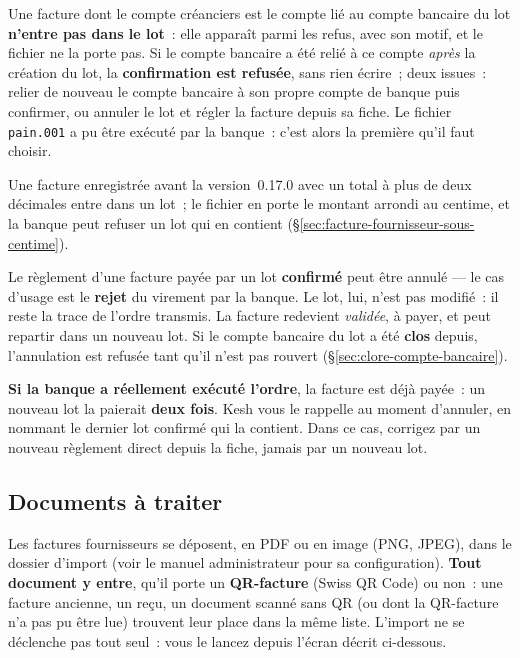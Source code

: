 \documentclass[a4paper,11pt,oneside]{article}
\begin{document}
Une facture dont le compte créanciers est le compte lié au compte bancaire du lot
\textbf{n'entre pas dans le lot}~: elle apparaît parmi les refus, avec son motif, et le fichier
ne la porte pas. Si le compte bancaire a été relié à ce compte \emph{après} la création du lot,
la \textbf{confirmation est refusée}, sans rien écrire~; deux issues~: relier de nouveau le compte
bancaire à son propre compte de banque puis confirmer, ou annuler le lot et régler la facture
depuis sa fiche. Le fichier \texttt{pain.001} a pu être exécuté par la banque~: c'est alors la
première qu'il faut choisir.

Une facture enregistrée avant la version~0.17.0 avec un total à plus de deux décimales
entre dans un lot~; le fichier en porte le montant arrondi au centime, et la banque peut refuser
un lot qui en contient (\S\ref{sec:facture-fournisseur-sous-centime}).

\begin{keshwarning}[title=\faExclamationTriangle\ Annuler le règlement d'une facture payée par lot]
Le règlement d'une facture payée par un lot \textbf{confirmé} peut être annulé --- le cas
d'usage est le \textbf{rejet} du virement par la banque. Le lot, lui, n'est pas modifié~: il
reste la trace de l'ordre transmis. La facture redevient \emph{validée}, à payer, et peut repartir dans un
nouveau lot. Si le compte bancaire du lot a été \textbf{clos} depuis, l'annulation est refusée
tant qu'il n'est pas rouvert (\S\ref{sec:clore-compte-bancaire}).

\textbf{Si la banque a réellement exécuté l'ordre}, la facture est déjà payée~: un nouveau lot
la paierait \textbf{deux fois}. Kesh vous le rappelle au moment d'annuler, en nommant le dernier
lot confirmé qui la contient. Dans ce cas, corrigez par un nouveau règlement direct depuis la
fiche, jamais par un nouveau lot.
\end{keshwarning}

\subsection{Documents à traiter}
\label{sec:import-factures}

Les factures fournisseurs se déposent, en PDF ou en image (PNG, JPEG), dans le dossier
d'import (voir le manuel administrateur pour sa configuration). \textbf{Tout document y
entre}, qu'il porte un \textbf{QR-facture} (Swiss QR Code) ou non~: une facture ancienne,
un reçu, un document scanné sans QR (ou dont la QR-facture n'a pas pu être lue) trouvent
leur place dans la même liste.
L'import ne se déclenche pas tout seul~: vous le lancez depuis l'écran décrit ci-dessous.
\end{document}
